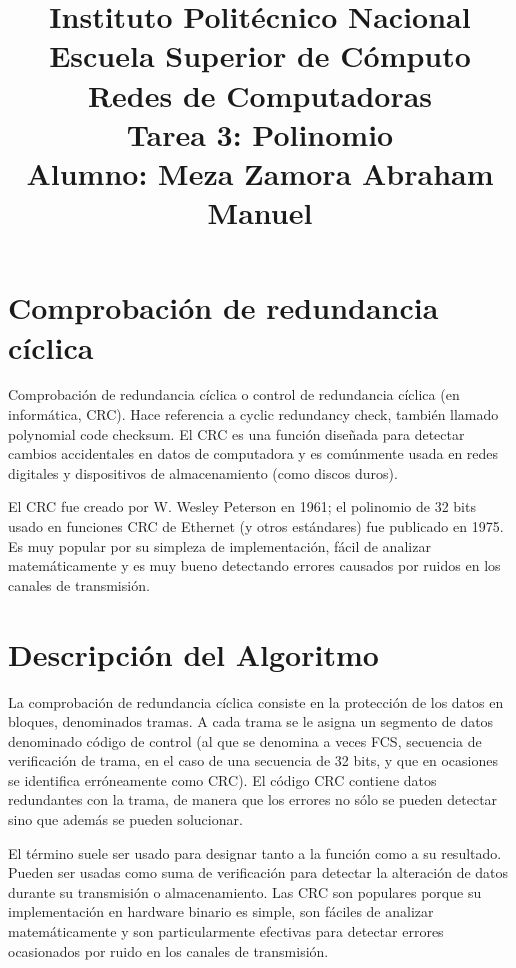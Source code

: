 \documentclass[a4paper,12pt]{article}
\begin{document}
\title{\Large Instituto Politécnico Nacional\\Escuela Superior de Cómputo\\Redes de Computadoras\\Tarea 3: Polinomio\\Alumno: Meza Zamora Abraham Manuel}
\date{}
\maketitle

\section{Comprobación de redundancia cíclica}
Comprobación de redundancia cíclica o control de redundancia cíclica (en informática, CRC). Hace referencia a cyclic redundancy check, también llamado polynomial code checksum. El CRC es una función diseñada para detectar cambios accidentales en datos de computadora y es comúnmente usada en redes digitales y dispositivos de almacenamiento (como discos duros).

El CRC fue creado por W. Wesley Peterson en 1961; el polinomio de 32 bits usado en funciones CRC de Ethernet (y otros estándares) fue publicado en 1975. Es muy popular por su simpleza de implementación, fácil de analizar matemáticamente y es muy bueno detectando errores causados por ruidos en los canales de transmisión.

\section{Descripción del Algoritmo}
La comprobación de redundancia cíclica consiste en la protección de los datos en bloques, denominados tramas. A cada trama se le asigna un segmento de datos denominado código de control (al que se denomina a veces FCS, secuencia de verificación de trama, en el caso de una secuencia de 32 bits, y que en ocasiones se identifica erróneamente como CRC). El código CRC contiene datos redundantes con la trama, de manera que los errores no sólo se pueden detectar sino que además se pueden solucionar.

El término suele ser usado para designar tanto a la función como a su resultado. Pueden ser usadas como suma de verificación para detectar la alteración de datos durante su transmisión o almacenamiento. Las CRC son populares porque su implementación en hardware binario es simple, son fáciles de analizar matemáticamente y son particularmente efectivas para detectar errores ocasionados por ruido en los canales de transmisión.
\end{document}
